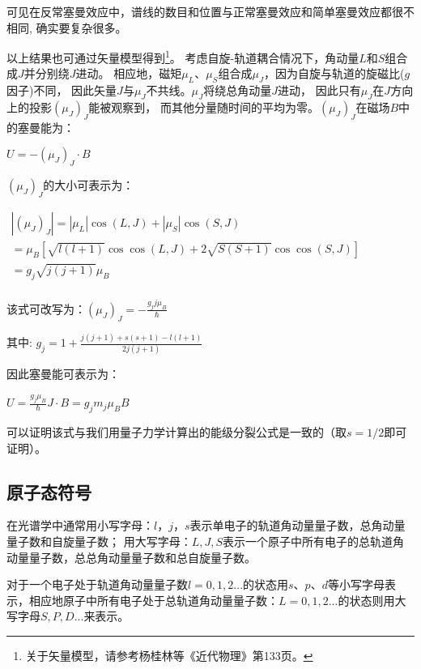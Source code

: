 可见在反常塞曼效应中，谱线的数目和位置与正常塞曼效应和简单塞曼效应都很不相同,
确实要复杂很多。

以上结果也可通过矢量模型得到\footnote{关于矢量模型，请参考杨桂林等《近代物理》第133页。}。
考虑自旋-轨道耦合情况下，角动量$L$和$S$组合成$J$并分别绕$J$进动。
相应地，磁矩$\mu _L $、$\mu _S $组合成$\mu _J $，因为自旋与轨道的旋磁比($g$因子)不同，
因此矢量$J$与$\mu _J$不共线。$\mu _J$将绕总角动量$J$进动，
因此只有$\mu _J$在$J$方向上的投影$\left( {\mu _J } \right)_J $能被观察到，
而其他分量随时间的平均为零。$\left( {\mu _J } \right)_J $在磁场$B$中的塞曼能为：

$U =  - \left( {\mu _J } \right)_J  \cdot B$

$\left( {\mu _J } \right)_J $的大小可表示为：

$\begin{array}{l}
 \left| {\left( {\mu _J } \right)_J } \right| = \left| {\mu _L } \right|\cos \left( {L,J} \right) + \left| {\mu _S } \right|\cos \left( {S,J} \right) \\
  = \mu _B \left[ {\sqrt {l\left( {l + 1} \right)} \cos \cos \left( {L,J} \right) + 2\sqrt {S\left( {S + 1} \right)} \cos \cos \left( {S,J} \right)} \right] \\
  = g_j \sqrt {j\left( {j + 1} \right)} \mu _B  \\
 \end{array}$

该式可改写为：$\left( {\mu _J } \right)_J  =  - \frac{{g_j j\mu _B }}{\hbar }$

其中: $g_j  = 1 + \frac{{j\left( {j + 1} \right) + s\left( {s + 1} \right) - l\left( {l + 1} \right)}}{{2j\left( {j + 1} \right)}}$

因此塞曼能可表示为：

$U = \frac{{g_j \mu _B }}{\hbar }J \cdot B = g_j m_j \mu _B B$

可以证明该式与我们用量子力学计算出的能级分裂公式是一致的（取$s=1/2$即可证明）。


\subsection{原子态符号}


在光谱学中通常用小写字母：$l$，$j$，$s$表示单电子的轨道角动量量子数，总角动量量子数和自旋量子数；
用大写字母：$L,J,S$表示一个原子中所有电子的总轨道角动量量子数，总总角动量量子数和总自旋量子数。

对于一个电子处于轨道角动量量子数$l = 0,1,2...$的状态用$s$、$p$、$d$等小写字母表示，相应地原子中所有电子处于总轨道角动量量子数：$L = 0,1,2...$的状态则用大写字母$S,P,D...$来表示。


